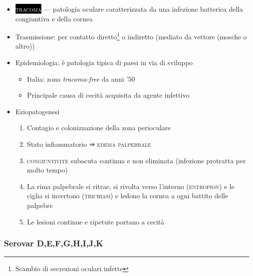 \documentclass[italian,]{article}
\providecommand{\tightlist}{%
  \setlength{\itemsep}{0pt}\setlength{\parskip}{0pt}}
\newcommand{\pat}[1]{\colorbox{black}{\textcolor{white}{\textsc{#1}}}}
\begin{document}
\begin{itemize}
\tightlist
\item
  \pat{tracoma} --- patologia oculare caratterizzata da una infezione
  batterica della congiuntiva e della cornea
\item
  Trasmissione: per contatto diretto\footnote{Scambio di secrezioni
    oculari infette} o indiretto (mediato da vettore (mosche o altro))
\item
  Epidemiologia: è patologia tipica di paesi in via di sviluppo

  \begin{itemize}
  \tightlist
  \item
    Italia: zona \emph{tracoma-free} da anni '50
  \item
    Principale causa di cecità acquisita da agente infettivo
  \end{itemize}
\item
  Eziopatogenesi

  \begin{enumerate}
  \def\labelenumi{\arabic{enumi}.}
  \setcounter{enumi}{-1}
  \tightlist
  \item
    Contagio e colonizzazione della zona perioculare
  \item
    Stato infiammatorio ⇒ \textsc{edema palpebrale}
  \item
    \textsc{congiuntivite} subacuta continua e non eliminata (infezione
    protratta per molto tempo)
  \item
    La rima palpebrale si ritrae, si rivolta verso l'interno
    (\textsc{entropion}) e le ciglia si invertono (\textsc{trichiasi}) e
    ledono la cornea a ogni battito delle palpebre
  \item
    Le lesioni continue e ripetute portano a cecità
  \end{enumerate}
\end{itemize}

\hypertarget{serovar-defghijk}{%
\subsubsection{Serovar D,E,F,G,H,I,J,K}\label{serovar-defghijk}}
\end{document}
